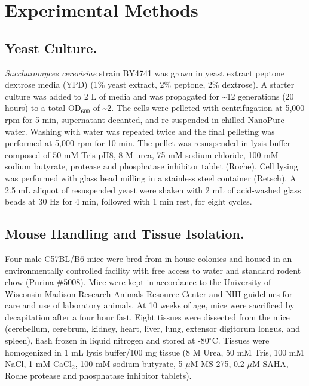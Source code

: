 \section{Experimental Methods}

\subsection*{Yeast Culture.}
\emph{Saccharomyces cerevisiae} strain BY4741 was grown in yeast extract peptone dextrose media (YPD) (1\% yeast extract, 2\% peptone, 2\% dextrose). A starter culture was added to 2 L of media and was propagated for \textasciitilde12 generations (20 hours) to a total OD$_{600}$ of \textasciitilde2. The cells were pelleted with centrifugation at 5,000 rpm for 5 min, supernatant decanted, and re-suspended in chilled NanoPure water. Washing with water was repeated twice and the final pelleting was performed at 5,000 rpm for 10 min. The pellet was resuspended in lysis buffer composed of 50 mM Tris pH8, 8 M urea, 75 mM sodium chloride, 100 mM sodium butyrate, protease and phosphatase inhibitor tablet (Roche). Cell lysing was performed with glass bead milling in a stainless steel container (Retsch). A 2.5 mL aliquot of resuspended yeast were shaken with 2 mL of acid-washed glass beads at 30 Hz for 4 min, followed with 1 min rest, for eight cycles.

\subsection*{Mouse Handling and Tissue Isolation.}
Four male C57BL/B6 mice were bred from in-house colonies and housed in an environmentally controlled facility with free access to water and standard rodent chow (Purina \#5008). Mice were kept in accordance to the University of Wisconsin-Madison Research Animals Resource Center and NIH guidelines for care and use of laboratory animals. At 10 weeks of age, mice were sacrificed by decapitation after a four hour fast. Eight tissues were dissected from the mice (cerebellum, cerebrum, kidney, heart, liver, lung, extensor digitorum longus, and spleen), flash frozen in liquid nitrogen and stored at -80$^\circ$C. Tissues were homogenized in 1 mL lysis buffer/100 mg tissue (8 M Urea, 50 mM Tris, 100 mM NaCl, 1 mM CaCl$_2$, 100 mM sodium butyrate, 5 $\mu$M MS-275, 0.2 $\mu$M SAHA, Roche protease and phosphatase inhibitor tablets).

